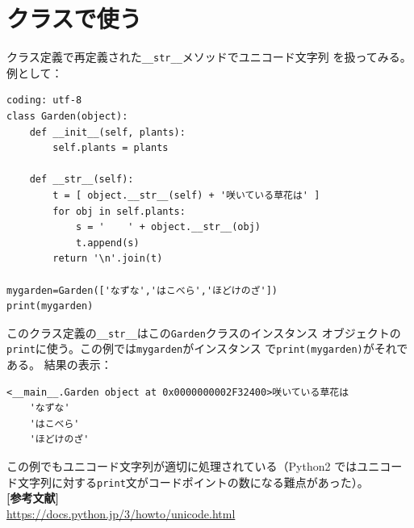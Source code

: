 \documentclass[a4j,12pt,makeidx]{jbook}
\begin{document}
\section{クラスで使う}
クラス定義で再定義された{\verb"__str__"}メソッドでユニコード文字列
を扱ってみる。例として：
\begin{verbatim}
coding: utf-8
class Garden(object):
    def __init__(self, plants):
        self.plants = plants
        
    def __str__(self):
        t = [ object.__str__(self) + '咲いている草花は' ]
        for obj in self.plants:
            s = '    ' + object.__str__(obj)
            t.append(s)
        return '\n'.join(t)

mygarden=Garden(['なずな','はこべら','ほどけのざ'])
print(mygarden)
\end{verbatim}
このクラス定義の{\verb"__str__"}はこの{\tt Garden}クラスのインスタンス
オブジェクトの{\tt print}に使う。この例では{\tt mygarden}がインスタンス
で{\tt print(mygarden)}がそれである。
結果の表示：
\begin{verbatim}
<__main__.Garden object at 0x0000000002F32400>咲いている草花は
    'なずな'
    'はこべら'
    'ほどけのざ'
\end{verbatim}
この例でもユニコード文字列が適切に処理されている（Python2
ではユニコード文字列に対する{\tt print}文がコードポイントの数になる難点があった）。\\

\noindent
{\bf [参考文献]} \\
\url{https://docs.python.jp/3/howto/unicode.html}
%
%
\clearpage
{}
\end{document}
